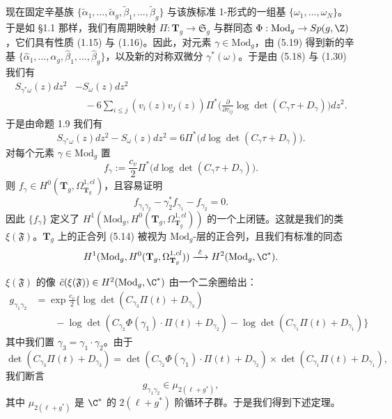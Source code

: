 现在固定辛基族 $\{\tilde\alpha_1,\dots,\tilde\alpha_g,\tilde\beta_1,\dots,\tilde\beta_g\}$ 与该族标准 1-形式的一组基 $\{\omega_1,\dots,\omega_N\}$。于是如 §1.1 那样，我们有周期映射 $\Pi:\mathbf T_g\to\mathfrak S_g$ 与群同态 $\Phi:\mathrm{Mod}_g\to Sp(g,\Z)$，它们具有性质 (1.15) 与 (1.16)。因此，对元素 $\gamma\in\mathrm{Mod}_g$，由 (5.19) 得到新的辛基 $\{\hat\alpha_1,\dots,\hat\alpha_g,\hat\beta_1,\dots,\hat\beta_g\}$，以及新的对称双微分 $\gamma^*(\omega)$。于是由 (5.18) 与 (1.30) 我们有
\begin{align}
 S_{\gamma^*\omega}(z)dz^2&-S_\omega(z)dz^2 \nonumber\\
 &\quad-6\sum_{i\le j}(v_i(z)v_j(z))\Pi^*\Big(\frac{\partial}{\partial\tau_{ij}}
 \log\det(C_\gamma\tau+D_\gamma)\Big)dz^2. \tag{5.20}
\end{align}
于是由命题 1.9 我们有
\[
 S_{\gamma^*\omega}(z)dz^2-S_\omega(z)dz^2
 =6\Pi^*\big(d\log\det(C_\gamma\tau+D_\gamma)\big).
\]
对每个元素 $\gamma\in\mathrm{Mod}_g$ 置
\begin{equation}
 f_\gamma:=\frac{c_v}{2}\Pi^*\big(d\log\det(C_\gamma\tau+D_\gamma)\big). \tag{5.21}
\end{equation}
则 $f_\gamma\in H^0(\mathbf T_g,\Omega^{1,cl}_{\mathbf T_g})$，且容易证明
\[
 f_{\gamma_1\gamma_2}-\gamma_2^*f_{\gamma_1}-f_{\gamma_2}=0.
\]
因此 $\{f_\gamma\}$ 定义了 $H^1(\mathrm{Mod}_g,H^0(\mathbf T_g,\Omega^{1,cl}_{\mathbf T_g}))$ 的一个上闭链。这就是我们的类 $\xi(\mathfrak F)$。$\mathbf T_g$ 上的正合列 (5.14) 被视为 $\mathrm{Mod}_g$-层的正合列，且我们有标准的同态
\[
 H^1(\mathrm{Mod}_g,H^0(\mathbf T_g,\Omega^{1,cl}_{\mathbf T_g}))
 \xrightarrow{\ \tilde c\ }H^2(\mathrm{Mod}_g,\C^*).
\]

$\xi(\mathfrak F)$ 的像 $\tilde c(\xi(\mathfrak F))\in H^2(\mathrm{Mod}_g,\C^*)$ 由一个二余圈给出：
\begin{align}
 g_{\gamma_1\gamma_2}&=\exp\frac{c_v}{2}\Big\{\log\det(C_{\gamma_3}\Pi(t)+D_{\gamma_3}) \nonumber\\
 &\qquad-\log\det(C_{\gamma_2}\Phi(\gamma_1)\cdot\Pi(t)+D_{\gamma_2})
 -\log\det(C_{\gamma_1}\Pi(t)+D_{\gamma_1})\Big\} \tag{5.22}
\end{align}
其中我们置 $\gamma_3=\gamma_1\cdot\gamma_2$。由于
\[
 \det(C_{\gamma_3}\Pi(t)+D_{\gamma_3})
 =\det(C_{\gamma_2}\Phi(\gamma_1)\cdot\Pi(t)+D_{\gamma_2})
 \times\det(C_{\gamma_1}\Pi(t)+D_{\gamma_1}),
\]
我们断言
\[
 g_{\gamma_1\gamma_2}\in\mu_{2(\ell+g^*)},
\]
其中 $\mu_{2(\ell+g^*)}$ 是 $\C^*$ 的 $2(\ell+g^*)$ 阶循环子群。于是我们得到下述定理。

